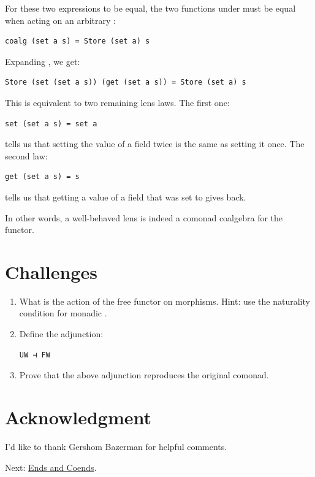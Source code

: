 For these two expressions to be equal, the two functions under
 must be equal when acting on an arbitrary :

\begin{verbatim}
coalg (set a s) = Store (set a) s
\end{verbatim}

Expanding , we get:

\begin{verbatim}
Store (set (set a s)) (get (set a s)) = Store (set a) s
\end{verbatim}

This is equivalent to two remaining lens laws. The first one:

\begin{verbatim}
set (set a s) = set a
\end{verbatim}

tells us that setting the value of a field twice is the same as setting
it once. The second law:

\begin{verbatim}
get (set a s) = s
\end{verbatim}

tells us that getting a value of a field that was set to 
gives  back.

In other words, a well-behaved lens is indeed a comonad coalgebra for
the  functor.

\section{Challenges}\label{challenges}

\begin{enumerate}
\item
  What is the action of the free functor
   on morphisms. Hint: use the
  naturality condition for monadic .
\item
  Define the adjunction:

\begin{verbatim}
UW ⊣ FW
\end{verbatim}
\item
  Prove that the above adjunction reproduces the original comonad.
\end{enumerate}

\section{Acknowledgment}\label{acknowledgment}

I'd like to thank Gershom Bazerman for helpful comments.

Next:
\href{https://bartoszmilewski.com/2017/03/29/ends-and-coends/}{Ends and
Coends}.
